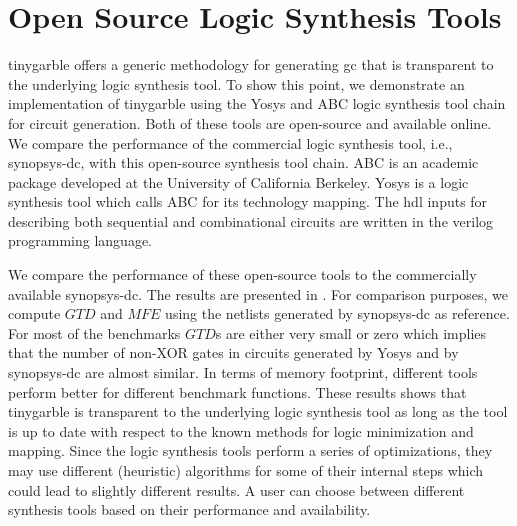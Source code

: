 \chapter{Open Source Logic Synthesis Tools}\label{chap:open-source}
\gls{tinygarble} offers a generic methodology for generating \acrshort{gc} that is transparent to the underlying logic synthesis tool.
To show this point, we demonstrate an implementation of \gls{tinygarble} using the Yosys \cite{tool:Yosys} and ABC \cite{tool:ABC} logic synthesis tool chain for circuit generation.
Both of these tools are open-source and available online.
We compare the performance of the commercial logic synthesis tool, i.e., \gls{synopsys-dc}, with this open-source synthesis tool chain.
ABC is an academic package developed at the University of California Berkeley.
Yosys is a logic synthesis tool which calls ABC for its technology mapping.
The \acrshort{hdl} inputs for describing both sequential and combinational circuits are written in the \gls{verilog} programming language.

We compare the performance of these open-source tools to the commercially available \gls{synopsys-dc}.
The results are presented in .
For comparison purposes, we compute $\mathit{GTD}$ and $\mathit{MFE}$ using the \gls{netlist}s generated by \gls{synopsys-dc} as reference.
For most of the benchmarks $\mathit{GTD}$s are either very small or zero which implies that the number of non-XOR gates in circuits generated by Yosys and by \gls{synopsys-dc} are almost similar.
In terms of memory footprint, different tools perform better for different benchmark functions.
These results shows that \gls{tinygarble} is transparent to the underlying logic synthesis tool as long as the tool is up to date with respect to the known methods for logic minimization and mapping.
Since the logic synthesis tools perform a series of optimizations, they may use different (heuristic) algorithms for some of their internal steps which could lead to slightly different results.
A user can choose between different synthesis tools based on their performance and availability.

